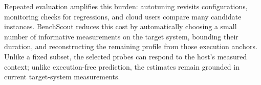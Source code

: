 \documentclass[sigconf, review, anonymous, balance=false]{acmart}
\newcommand{\ourmethod}{\textsc{BenchScout}\xspace}
\begin{document}
Repeated evaluation amplifies this burden: autotuning revisits configurations, monitoring checks for regressions, and cloud users compare many candidate instances. BenchScout reduces this cost by automatically choosing a small number of informative measurements on the target system, bounding their duration, and reconstructing the remaining profile from those execution anchors. Unlike a fixed subset, the selected probes can respond to the host's measured context; unlike execution-free prediction, the estimates remain grounded in current target-system measurements.






\end{document}
